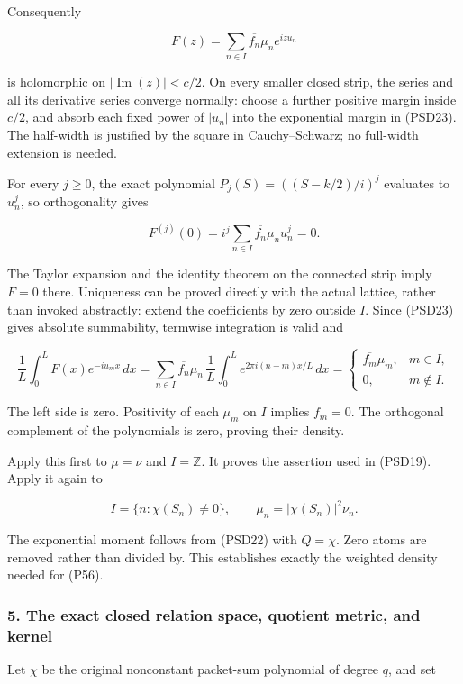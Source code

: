 Consequently

\[
F(z)=\sum_{n\in I}\overline{f_n}\mu_ne^{izu_n}
\tag{PSD24}
\]

is holomorphic on \(|\operatorname{Im}(z)|<c/2\). On every smaller closed strip, the series and all its derivative series converge normally: choose a further positive margin inside \(c/2\), and absorb each fixed power of \(|u_n|\) into the exponential margin in (PSD23). The half-width is justified by the square in Cauchy--Schwarz; no full-width extension is needed.

For every \(j\ge 0\), the exact polynomial \(P_j(S)=((S-k/2)/i)^j\) evaluates to \(u_n^j\), so orthogonality gives

\[
F^{(j)}(0)=i^j\sum_{n\in I}\overline{f_n}\mu_nu_n^j=0.
\tag{PSD25}
\]

The Taylor expansion and the identity theorem on the connected strip imply \(F=0\) there. Uniqueness can be proved directly with the actual lattice, rather than invoked abstractly: extend the coefficients by zero outside \(I\). Since (PSD23) gives absolute summability, termwise integration is valid and

\[
\frac1L\int_0^L F(x)e^{-iu_mx}\,dx
=\sum_{n\in I}\overline{f_n}\mu_n\,
\frac1L\int_0^L e^{2\pi i(n-m)x/L}\,dx
=\begin{cases}\overline{f_m}\mu_m,&m\in I,\\0,&m\notin I.\end{cases}
\tag{PSD26}
\]

The left side is zero. Positivity of each \(\mu_m\) on \(I\) implies \(f_m=0\). The orthogonal complement of the polynomials is zero, proving their density.

Apply this first to \(\mu=\nu\) and \(I=\mathbb Z\). It proves the assertion used in (PSD19). Apply it again to

\[
I=\{n:\chi(S_n)\ne0\},\qquad
\mu_n=|\chi(S_n)|^2\nu_n.
\tag{PSD27}
\]

The exponential moment follows from (PSD22) with \(Q=\chi\). Zero atoms are removed rather than divided by. This establishes exactly the weighted density needed for (P56).

\subsubsection{5. The exact closed relation space, quotient metric, and kernel}\label{the-exact-closed-relation-space-quotient-metric-and-kernel}

Let \(\chi\) be the original nonconstant packet-sum polynomial of degree \(q\), and set

